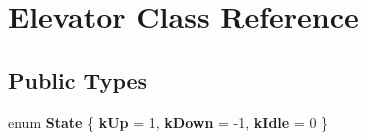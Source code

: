 \hypertarget{class_elevator}{}\section{Elevator Class Reference}
\label{class_elevator}
\subsection*{Public Types}
\begin{DoxyCompactItemize}
\item 
\mbox{\label{class_elevator_acfb8a789116c1748f69633bbd07674db}} 
enum {\bfseries State} \{ {\bfseries k\+Up} = 1, 
{\bfseries k\+Down} = -\/1, 
{\bfseries k\+Idle} = 0
 \}
\end{DoxyCompactItemize}
